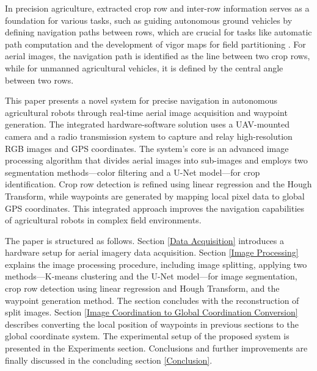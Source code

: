 \documentclass[conference]{IEEEtran}
\begin{document}
In precision agriculture, extracted crop row and inter-row information serves as a foundation for various tasks, such as guiding autonomous ground vehicles by defining navigation paths between rows, which are crucial for tasks like automatic path computation and the development of vigor maps for field partitioning \cite{b11}. For aerial images, the navigation path is identified as the line between two crop rows, while for unmanned agricultural vehicles, it is defined by the central angle between two rows\cite{b1}.


This paper presents a novel system for precise navigation in autonomous agricultural robots through real-time aerial image acquisition and waypoint generation. The integrated hardware-software solution uses a UAV-mounted camera and a radio transmission system to capture and relay high-resolution RGB images and GPS coordinates. The system's core is an advanced image processing algorithm that divides aerial images into sub-images and employs two segmentation methods—color filtering and a U-Net model—for crop identification. Crop row detection is refined using linear regression and the Hough Transform, while waypoints are generated by mapping local pixel data to global GPS coordinates. This integrated approach improves the navigation capabilities of agricultural robots in complex field environments.

The paper is structured as follows. Section \ref{Data Acquisition} introduces a hardware setup for aerial imagery data acquisition. Section \ref{Image Processing} explains the image processing procedure, including image splitting, applying two methods—K-means clustering and the U-Net model—for image segmentation, crop row detection using linear regression and Hough Transform, and the waypoint generation method. The section concludes with the reconstruction of split images. Section \ref{Image Coordination to Global Coordination Conversion} describes converting the local position of waypoints in previous sections to the global coordinate system. The experimental setup of the proposed system is presented in the Experiments section. Conclusions and further improvements are finally discussed in the concluding section
\ref{Conclusion}.
\end{document}
